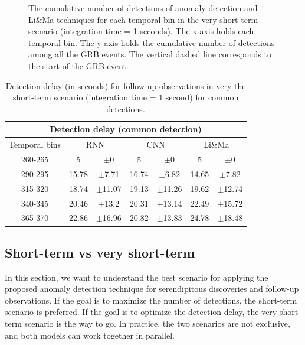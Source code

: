 \begin{figure}[!ht]
\centering

\captionsetup{width=1\linewidth}
\caption{The cumulative number of detections of anomaly detection and Li\&Ma techniques for each temporal bin in the very short-term scenario (integration time = 1 seconds). The x-axis holds each temporal bin. The y-axis holds the cumulative number of detections among all the GRB events. The vertical dashed line corresponds to the start of the GRB event.}
\label{f:follow-up-itime-1}
\end{figure}


\begin{table}[!ht]
\centering
\begin{tabular}{|c|cc|cc|cc|} 
\hline
\multicolumn{7}{|c|}{\textbf{Detection delay} (common detection)} \\ 
\hline
\multicolumn{1}{|c|}{Temporal bins} & \multicolumn{2}{c|}{RNN} & \multicolumn{2}{c|}{CNN} & \multicolumn{2}{c|}{Li\&Ma} \\ 
\hline
260-265 & 5 &  $\pm$0 & 5 &  $\pm$0 & 5 &  $\pm$0 \\
290-295&15.78&$\pm$7.71&16.74&$\pm$6.82&14.65&$\pm$7.82\\
315-320&18.74&$\pm$11.07&19.13&$\pm$11.26&19.62&$\pm$12.74\\
340-345&20.46&$\pm$13.2&20.31&$\pm$13.14&22.49&$\pm$15.72\\
365-370&22.86&$\pm$16.96&20.82&$\pm$13.83&24.78&$\pm$18.48\\
\hline
\end{tabular}
\caption{Detection delay (in seconds) for follow-up observations in very the short-term scenario (integration time = 1 second) for common detections.}
\label{tab:dd-follow-up-itime-1-common}
\end{table}



\FloatBarrier
\subsection{Short-term vs very short-term}
\label{s:Short-term-vs-very-short-term}
In this section, we want to understand the best scenario for applying the proposed anomaly detection technique for serendipitous discoveries and follow-up observations. 
If the goal is to maximize the number of detections, the short-term scenario is preferred. If the goal is to optimize the detection delay, the very short-term scenario is the way to go. In practice, the two scenarios are not exclusive, and both models can work together in parallel. 